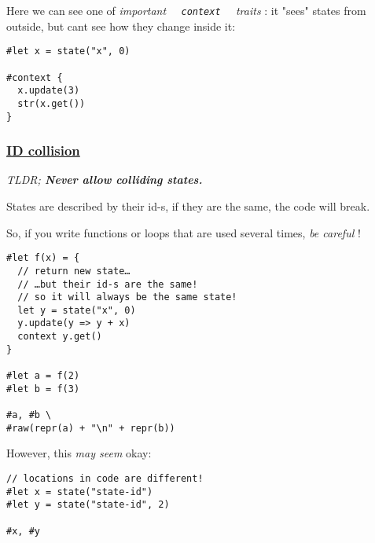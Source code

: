 \pandocbounded{}

Here we can see one of \emph{important
\texttt{\ }{\texttt{\ context\ }}\texttt{\ } traits} : it "sees" states
from outside, but can\textquotesingle t see how they change inside it:

\begin{verbatim}
#let x = state("x", 0)

#context {
  x.update(3)
  str(x.get())
}
\end{verbatim}

\pandocbounded{}

\subsubsection{\texorpdfstring{\hyperref[id-collision]{ID
collision}}{ID collision}}\label{id-collision}

\emph{TLDR; \textbf{Never allow colliding states.}}

States are described by their id-s, if they are the same, the code will
break.

So, if you write functions or loops that are used several times,
\emph{be careful} !

\begin{verbatim}
#let f(x) = {
  // return new state…
  // …but their id-s are the same!
  // so it will always be the same state!
  let y = state("x", 0)
  y.update(y => y + x)
  context y.get()
}

#let a = f(2)
#let b = f(3)

#a, #b \
#raw(repr(a) + "\n" + repr(b))
\end{verbatim}

\pandocbounded{}

However, this \emph{may seem} okay:

\begin{verbatim}
// locations in code are different!
#let x = state("state-id")
#let y = state("state-id", 2)

#x, #y
\end{verbatim}

\pandocbounded{}

